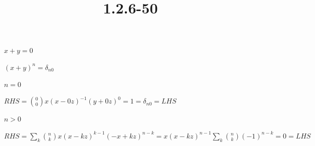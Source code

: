 \documentclass{article}
\title{1.2.6-50}
\begin{document}
\maketitle

\( x + y = 0 \)

\( (x+y)^n = \delta_{n0} \)

\( n = 0 \)

\( RHS = \binom{0}{0} x(x-0z)^{-1}(y+0z)^0=1 = \delta_{n0} = LHS \)

\( n > 0 \)

\( RHS = \sum_k \binom{n}{k}x(x-kz)^{k-1}(-x+kz)^{n-k} = x(x-kz)^{n-1} \sum_{k} \binom{n}{k} (-1)^{n-k} = 0 = LHS \)
\end{document}
